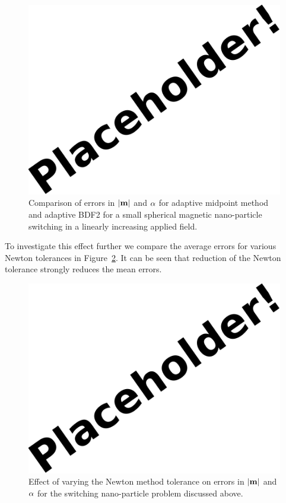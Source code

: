\begin{figure}[ht!]
  \centering
  \includegraphics{images/placeholder}
  \caption{Comparison of errors in $\lvert \mathbf{m} \rvert$ and $\alpha$ for adaptive midpoint method and adaptive BDF2 for a small spherical magnetic nano-particle switching in a linearly increasing applied field.}
  \label{fig:linear-field-switch-errors-mp}
\end{figure}


To investigate this effect further we compare the average errors for various Newton tolerances in Figure~\ref{fig:newton-tol-errors-mp}.
It can be seen that reduction of the Newton tolerance strongly reduces the mean errors.

\begin{figure}[ht!]
  \centering
  \includegraphics{images/placeholder}
  \caption{Effect of varying the Newton method tolerance on errors in $\lvert \mathbf{m} \rvert$ and $\alpha$  for the switching nano-particle problem discussed above.}
  \label{fig:newton-tol-errors-mp}
\end{figure}


